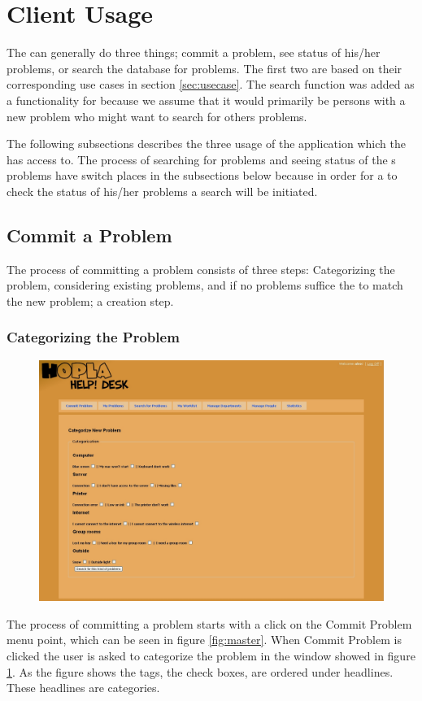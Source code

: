 \section{Client Usage}
\label{sec:client_usage}
The \aclient[] can generally do three things; commit a problem, see status of his/her problems, or search the database for problems.
The first two are based on their corresponding use cases in section \ref{sec:usecase}.
The search function was added as a functionality for \aclient[] because we assume that it would primarily be persons with a new problem who might want to search for others problems.

The following subsections describes the three usage of the application which the \aclient[] has access to.
The process of searching for problems and seeing status of the \aclient[]s problems have switch places in the subsections below because in order for a \aclient[] to check the status of his/her problems a search will be initiated.

\subsection{Commit a Problem}
\label{sub:commit}
The process of committing a problem consists of three steps: Categorizing the problem, considering existing problems, and if no problems suffice the to match the new problem; a creation step.

\subsubsection{Categorizing the Problem}
\begin{figure}[htb]
	\centering
		\includegraphics[width=1.00\textwidth, clip=true, trim=2.9cm 0.5cm 15cm 8cm]{input/implementation/program_presentation/commit.png}
	\label{fig:commit}
\end{figure}
The process of committing a problem starts with a click on the Commit Problem menu point, which can be seen in figure \ref{fig:master}.
When Commit Problem is clicked the user is asked to categorize the problem in the window showed in figure \ref{fig:commit}.
As the figure shows the tags, the check boxes, are ordered under headlines.
These headlines are categories.


